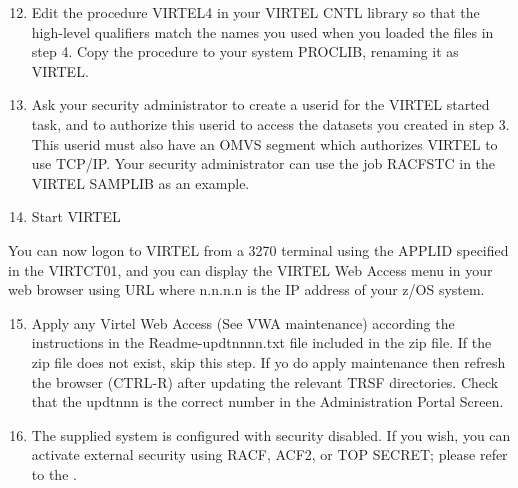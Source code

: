 \documentclass[letterpaper,10pt,english]{sphinxmanual}
\begin{document}
\begin{sphinxVerbatim}[commandchars=\\\{\}]
 
\end{sphinxVerbatim}
\begin{enumerate}
\setcounter{enumi}{11}
\item {} 
Edit the procedure VIRTEL4 in your VIRTEL CNTL library so that the high-level qualifiers match the names you used when you loaded the files in step 4. Copy the procedure to your system PROCLIB, renaming it as VIRTEL.

\item {} 
Ask your security administrator to create a userid for the VIRTEL started task, and to authorize this userid to access the datasets you created in step 3. This userid must also have an OMVS segment which authorizes VIRTEL to use TCP/IP. Your security administrator can use the job RACFSTC in the VIRTEL SAMPLIB as an example.

\item {} 
Start VIRTEL

\end{enumerate}

You can now logon to VIRTEL from a 3270 terminal using the APPLID specified in the VIRTCT01, and you can display the VIRTEL Web Access menu in your web browser using URL  where n.n.n.n is the IP address of your z/OS system.
\begin{enumerate}
\setcounter{enumi}{14}
\item {} 
Apply any Virtel Web Access (See VWA maintenance) according the instructions in the Readme-updtnnnn.txt file included in the zip file. If the zip file does not exist, skip this step. If yo do apply maintenance then refresh the browser (CTRL-R) after updating the relevant TRSF directories. Check that the updtnnn is the correct number in the Administration Portal Screen.

\item {} 
The supplied system is configured with security disabled. If you wish, you can activate external security using RACF, ACF2, or TOP SECRET; please refer to the {\hyperref[\detokenize{Installation_Guide:vvrrig-security}]{}}.

\end{enumerate}

\end{document}
